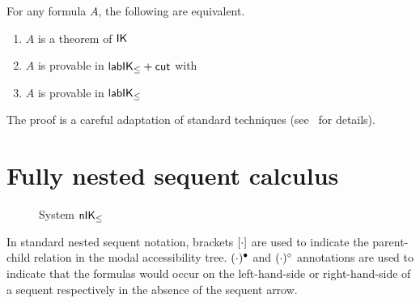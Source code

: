 \documentclass[twoside]{aiml20}
\begin{document}
\begin{theorem}\label{thm:cutfree-compl}
	For any formula $A$, the following are equivalent.
	\begin{enumerate}
		\item\label{i} $A$ is a theorem of $\mathsf{IK}$ 
		\item\label{ii} $A$ is provable in $\mathsf{lab}\mathsf{IK}_{\le} +\mathsf{cut}_{}$ with \quad
		\item\label{iii} $A$ is provable in $\mathsf{lab}\mathsf{IK}_{\le}$
	\end{enumerate}
\end{theorem}

The proof is a careful adaptation of standard techniques (see~\cite{marin:morales:strassburger:hal} for details).




\section{Fully nested sequent calculus}\label{sec:nested}

\begin{figure}
	\centering
\caption{System $\mathsf{n}\mathsf{IK}_{\le}$}
\label{fig:nIK}
\end{figure}

%
%
In standard nested sequent notation, brackets $\BR{\cdot}$ are used to indicate the parent-child relation in the modal accessibility tree.
%
$(\cdot)^\bullet$ and $(\cdot)^\circ$ annotations are used to indicate that the formulas would occur on the left-hand-side or right-hand-side of a sequent respectively in the absence of the sequent arrow.  
\end{document}
